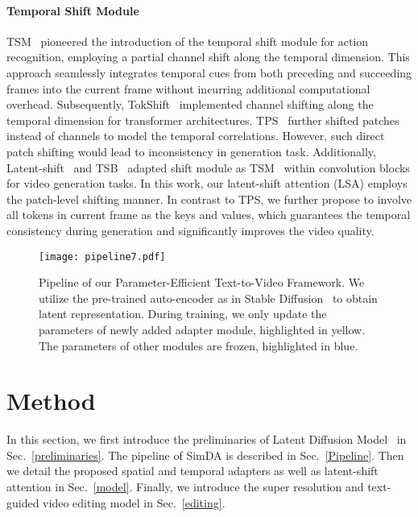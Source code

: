 \paragraph{Temporal Shift Module}
TSM~\cite{tsm} pioneered the introduction of the temporal shift module for action recognition, employing a partial channel shift along the temporal dimension. This approach seamlessly integrates temporal cues from both preceding and succeeding frames into the current frame without incurring additional computational overhead. Subsequently, TokShift~\cite{tokenshift} implemented channel shifting along the temporal dimension for transformer architectures.
TPS~\cite{tps} further shifted patches instead of channels to model the temporal correlations.
However, such direct patch shifting would lead to inconsistency in generation task.
Additionally, Latent-shift~\cite{latentshift} and TSB~\cite{shiftgan} adapted shift module as TSM~\cite{tsm} within convolution blocks for video generation tasks.
In this work, our latent-shift attention (LSA) employs the patch-level shifting manner. In contrast to TPS, we further propose to involve all tokens in current frame as the keys and values, which guarantees the temporal consistency during generation and significantly improves the video quality.

\begin{figure*}
    \centering
    \texttt{[image: pipeline7.pdf]}
    \caption{Pipeline of our Parameter-Efficient Text-to-Video Framework. We utilize the pre-trained auto-encoder as in Stable Diffusion~\cite{stablediffusion} to obtain latent representation. During training, we only update the parameters of newly added adapter module, highlighted in \textcolor{myred}{yellow}. The parameters of other modules are frozen, highlighted in \textcolor{mygreen}{blue}. }
    \label{fig:pipeline}
\end{figure*}

\section{Method}
In this section, we first introduce the preliminaries of Latent Diffusion Model~\cite{stablediffusion} in Sec.~\ref{preliminaries}. The pipeline of SimDA is described in Sec.~\ref{Pipeline}. Then we detail the proposed spatial and temporal adapters as well as latent-shift attention in Sec.~\ref{model}. Finally, we introduce the super resolution and text-guided video editing model in Sec.~\ref{editing}.

